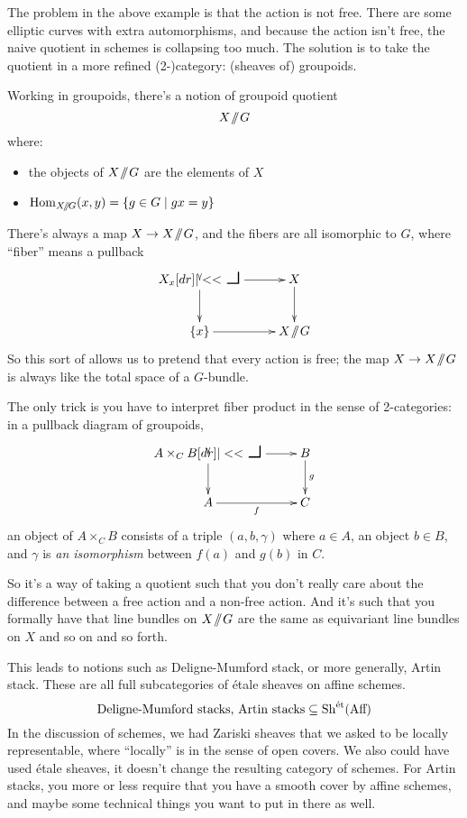 The problem in the above example is that the action is not free. There are some elliptic curves with extra automorphisms, and because the action isn't free, the naive quotient in schemes is collapsing too much. The solution is to take the quotient in a more refined (2-)category: (sheaves of) groupoids.

Working in groupoids, there's a notion of groupoid quotient
\[ X \mathbin{\!/\!\!/\!} G \]
where:
\begin{itemize}
  \item the objects of $X\mathbin{\!/\!\!/\!} G$ are the elements of $X$
  \item $\operatorname{Hom}_{X\mathbin{\!/\!\!/\!} G}(x,y) = \{g\in G \mid gx = y \}$
\end{itemize}

There's always a map $X\to X\mathbin{\!/\!\!/\!} G$, and the fibers are all isomorphic to $G$, where ``fiber'' means a pullback
\[\xymatrix{
  X_x \ar[r] \ar[d] \pullback & X \ar[d]\\
  \{x\} \ar[r] & X \gq G
}\]
So this sort of allows us to pretend that every action is free; the map $X\to X\mathbin{\!/\!\!/\!} G$ is always like the total space of a $G$-bundle.

The only trick is you have to interpret fiber product in the sense of 2-categories: in a pullback diagram of groupoids,
\[\xymatrix{
  A \times_C B \ar[r] \ar[d] \pullback & B \ar[d]^-g\\
  A \ar[r]_-f & C
}\]
an object of $A\times_C B$ consists of a triple $(a,b,\gamma)$ where $a\in A$, an object $b\in B$, and $\gamma$ is \emph{an isomorphism} between $f(a)$ and $g(b)$ in $C$.

So it's a way of taking a quotient such that you don't really care about the difference between a free action and a non-free action. And it's such that you formally have that line bundles on $X\mathbin{\!/\!\!/\!} G$ are the same as equivariant line bundles on $X$ and so on and so forth.

This leads to notions such as Deligne-Mumford stack, or more generally, Artin stack. These are all full subcategories of \'etale sheaves on affine schemes.
\[
  \text{Deligne-Mumford stacks, Artin stacks}
  \subseteq
  \operatorname{Sh}^{\text{\'et}}(\text{Aff})
\]
In the discussion of schemes, we had Zariski sheaves that we asked to be locally representable, where ``locally'' is in the sense of open covers. We also could have used \'etale sheaves, it doesn't change the resulting category of schemes. For Artin stacks, you more or less require that you have a smooth cover by affine schemes, and maybe some technical things you want to put in there as well.

